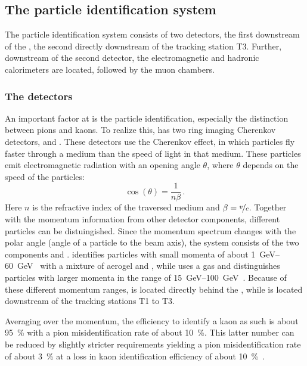 \subsection{The particle identification system}
\label{sec:PartID}

The particle identification system consists of two \rich detectors, the first downstream of the \velo, the second directly downstream of the tracking station T3.
Further, downstream of the second \rich detector, the electromagnetic and hadronic calorimeters are located, followed by the muon chambers.

\subsubsection*{The \rich detectors}
\label{sec:rich}

An important factor at \lhcb is the particle identification, especially the distinction between pions and kaons.
To realize this, \lhcb has two ring imaging Cherenkov detectors, \richone and \richtwo.
These detectors use the Cherenkov effect, in which particles fly faster through a medium than the speed of light in that medium.
These particles emit electromagnetic radiation with an opening angle $\theta$, where $\theta$ depends on the speed of the particles:
\begin{equation}
\cos\!\left(\theta\right) = \frac{1}{n\beta}\,.
\end{equation}
Here $n$ is the refractive index of the traversed medium and $\beta = \nicefrac{v}{c}$.
Together with the momentum information from other detector components, different particles can be distuingished.
Since the momentum spectrum changes with the polar angle (angle of a particle to the beam axis), the \rich system consists of the two components \richone and \richtwo.
\richone identifies particles with small momenta of about \SIrange{1}{60}{\giga\electronvolt}~\cite{Alves:2008zz} with a mixture of aerogel and \cfourften, while \richtwo uses a \cffour gas and distinguishes particles with larger momenta in the range of \SIrange{15}{100}{\giga\electronvolt}~\cite{Alves:2008zz}. Because of these different momentum ranges, \richone is located directly behind the \velo, while \richtwo is located downstream of the tracking stations T1 to T3.

Averaging over the momentum, the efficiency to identify a kaon as such is about \SI{95}{\percent} with a pion misidentification rate of about \SI{10}{\percent}. This latter number can be reduced by slightly stricter requirements yielding a pion misidentification rate of about \SI{3}{\percent} at a loss in kaon identification efficiency of about \SI{10}{\percent}~\cite{Aaij:2014jba}.


